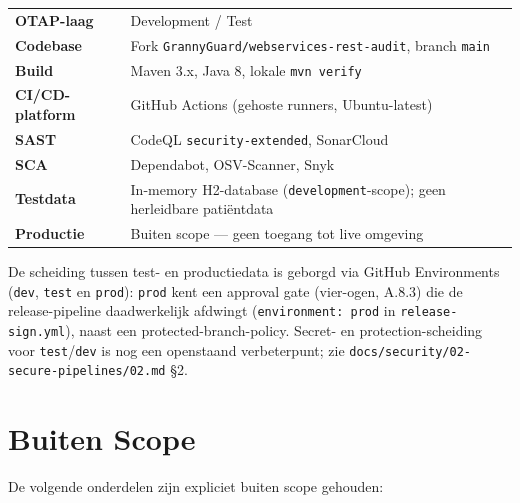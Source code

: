 \documentclass[12pt, a4paper]{report}
\begin{document}
\begin{tabular}{@{}ll}
    \textbf{OTAP-laag}        & Development / Test \\[4pt]
    \textbf{Codebase}         & Fork \texttt{GrannyGuard/webservices-rest-audit},
                                branch \texttt{main} \\[4pt]
    \textbf{Build}            & Maven 3.x, Java 8, lokale \texttt{mvn verify} \\[4pt]
    \textbf{CI/CD-platform}   & GitHub Actions (gehoste runners, Ubuntu-latest) \\[4pt]
    \textbf{SAST}             & CodeQL \texttt{security-extended}, SonarCloud \\[4pt]
    \textbf{SCA}              & Dependabot, OSV-Scanner, Snyk \\[4pt]
    \textbf{Testdata}         & In-memory H2-database (\texttt{development}-scope);
                                geen herleidbare patiëntdata \\[4pt]
    \textbf{Productie}        & Buiten scope --- geen toegang tot live omgeving \\
\end{tabular}

De scheiding tussen test- en productiedata is geborgd via GitHub Environments
(\texttt{dev}, \texttt{test} en \texttt{prod}): \texttt{prod} kent een approval
gate (vier-ogen, A.8.3) die de release-pipeline daadwerkelijk afdwingt
(\texttt{environment: prod} in \texttt{release-sign.yml}), naast een
protected-branch-policy. Secret- en protection-scheiding voor \texttt{test}/\texttt{dev}
is nog een openstaand verbeterpunt; zie
\texttt{docs/security/02-secure-pipelines/02.md} \S2.

\section{Buiten Scope}
\label{sec:buiten-scope}

De volgende onderdelen zijn expliciet buiten scope gehouden:
\end{document}
